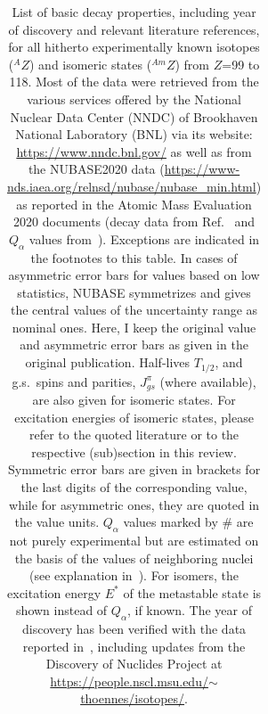 \onecolumn
\begin{center}\scriptsize
\begin{longtable}{c|ccccccl}
\caption {
List of basic decay properties, including year of discovery and relevant literature references, for all hitherto experimentally known isotopes ($^AZ$) and isomeric states ($^{Am}Z$) from $Z$=99 to 118. 
Most of the data were retrieved from the various services offered by the National Nuclear Data Center (NNDC) of Brookhaven National Laboratory (BNL) via its website: \href{https://www.nndc.bnl.gov/}{https://www.nndc.bnl.gov/} as well as from the NUBASE2020 data (\href{https://www-nds.iaea.org/relnsd/nubase/nubase_min.html}{https://www-nds.iaea.org/relnsd/nubase/nubase\_min.html}) 
as reported in the Atomic Mass Evaluation 2020 documents (decay data from Ref.~\cite{Kondev2021} and $Q_\alpha$ values from~\cite{Wang2021}). 
Exceptions are indicated in the footnotes to this table. 
In cases of asymmetric error bars for values based on low statistics, NUBASE symmetrizes and gives the central values of the uncertainty range as nominal ones. 
Here, I keep the original value and asymmetric error bars as given in the original publication.
Half-lives $T_{1/2}$, and g.s.~spins and parities,  $J_{gs}^\pi$ (where available), are also given for isomeric states. 
For excitation energies of isomeric states, please refer to the quoted literature or to the respective (sub)section in this review. 
Symmetric error bars are given in brackets for the last digits of the corresponding value, while for asymmetric ones, they are quoted in the value units. 
$Q_\alpha$ values marked by $\#$ are not purely experimental but are estimated on the basis of the values of neighboring nuclei (see explanation in~\cite{Wang2021}). 
For isomers, the excitation energy $E^*$ of the metastable state is shown instead of $Q_\alpha$, if known.
The year of discovery has been verified with the data reported in~\cite{Thoennessen2016}, including updates from the Discovery of Nuclides Project at \href{https://people.nscl.msu.edu/~thoennes/isotopes/}{https://people.nscl.msu.edu/$\sim$thoennes/isotopes/}.
}
\end{longtable}
\end{center}
